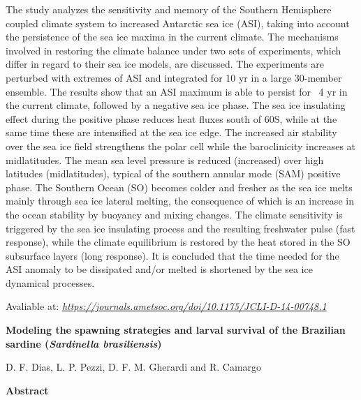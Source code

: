 \noindent The study analyzes the sensitivity and memory of the Southern Hemisphere coupled climate system to increased Antarctic sea ice (ASI), taking into account the persistence of the sea ice maxima
          in the current climate. The mechanisms involved in restoring the climate balance under two sets of experiments, which differ in regard to their sea ice models, are discussed. The experiments 
          are perturbed with extremes of ASI and integrated for 10 yr in a large 30-member ensemble. The results show that an ASI maximum is able to persist for ~4 yr in the current climate, 
          followed by a negative sea ice phase. The sea ice insulating effect during the positive phase reduces heat fluxes south of 60\degree S, while at the same time these are intensified at the 
          sea ice edge. The increased air stability over the sea ice field strengthens the polar cell while the baroclinicity increases at midlatitudes. The mean sea level pressure is reduced 
          (increased) over high latitudes (midlatitudes), typical of the southern annular mode (SAM) positive phase. The Southern Ocean (SO) becomes colder and fresher as the sea ice melts mainly through 
          sea ice lateral melting, the consequence of which is an increase in the ocean stability by buoyancy and mixing changes. The climate sensitivity is triggered by the sea ice insulating process and 
          the resulting freshwater pulse (fast response), while the climate equilibrium is restored by the heat stored in the SO subsurface layers (long response). It is concluded that the time needed for 
          the ASI anomaly to be dissipated and/or melted is shortened by the sea ice dynamical processes.

\bigskip
\noindent {}
\bigskip

\noindent Avaliable at: \textcolor{bleu_cite}{\href{https://journals.ametsoc.org/doi/10.1175/JCLI-D-14-00748.1}{\textit{https://journals.ametsoc.org/doi/10.1175/JCLI-D-14-00748.1}}}

\bigskip

\newpage
\bigskip

\noindent \begin{center} \textbf{Modeling the spawning strategies and larval survival of the Brazilian sardine (\textit{Sardinella brasiliensis})}
\bigskip

\noindent D. F. Dias, L. P. Pezzi, D. F. M. Gherardi and R. Camargo
\bigskip

\noindent \textbf{Abstract}\end{center}
\bigskip

